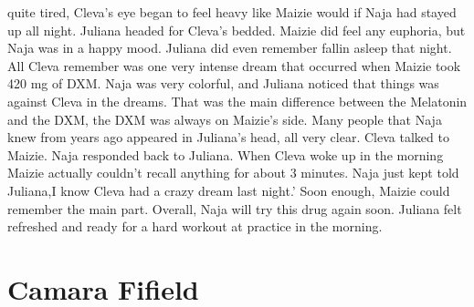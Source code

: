\documentclass[12pt]{book}
\begin{document}
quite tired, Cleva's eye began to feel heavy like Maizie would if Naja had stayed up all night. Juliana headed for Cleva's bedded. Maizie did feel any euphoria, but Naja was in a happy mood. Juliana did even remember fallin asleep that night. All Cleva remember was one very intense dream that occurred when Maizie took 420 mg of DXM. Naja was very colorful, and Juliana noticed that things was against Cleva in the dreams. That was the main difference between the Melatonin and the DXM, the DXM was always on Maizie's side. Many people that Naja knew from years ago appeared in Juliana's head, all very clear. Cleva talked to Maizie. Naja responded back to Juliana. When Cleva woke up in the morning Maizie actually couldn't recall anything for about 3 minutes. Naja just kept told Juliana,I know Cleva had a crazy dream last night.' Soon enough, Maizie could remember the main part. Overall, Naja will try this drug again soon. Juliana felt refreshed and ready for a hard workout at practice in the morning.



\chapter{Camara Fifield}
\end{document}
